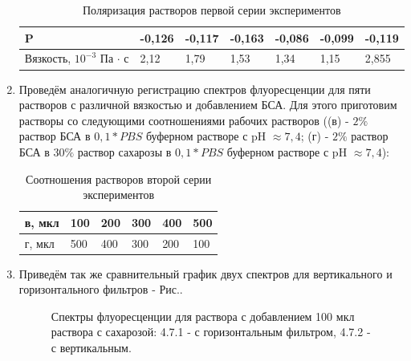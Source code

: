 \documentclass{article}
\begin{document}
\begin{enumerate}
    \begin{table}[h!]
    \centering
    \caption{Поляризация растворов первой серии экспериментов}
    \begin{tabular}{|l|l|l|l|l|l|l|}
    \hline
    P & -0,126 & -0,117 & -0,163 & -0,086 & -0,099 & -0,119 \\ \hline
    Вязкость, $10^{-3}$ Па $\cdot$ с & 2,12 & 1,79 & 1,53 & 1,34 & 1,15 & 2,855 \\ \hline
    \end{tabular}
    \end{table}
    \item Проведём аналогичную регистрацию спектров флуоресценции для пяти растворов с различной вязкостью и добавлением БСА. Для этого приготовим растворы со следующими соотношениями рабочих растворов ((в) - $2\%$ раствор БСА в $0,1 * PBS$ буферном растворе с pH $\approx 7,4$; (г) - $2\%$ раствор БСА в $30 \%$ раствор сахарозы в $0,1 * PBS$ буферном растворе с pH $\approx 7,4$):
    \begin{table}[h!]
    \centering
    \caption{Соотношения растворов второй серии экспериментов}
    \begin{tabular}{|l|l|l|l|l|l|}
    \hline
    в, мкл & 100 & 200 & 300 & 400 & 500\\ \hline
    г, мкл & 500 & 400 & 300 & 200 & 100\\ \hline
    \end{tabular}
    \end{table}
    \item Приведём так же сравнительный график двух спектров для вертикального и горизонтального фильтров - Рис.. 
    \begin{figure}[h!]
    \caption{Спектры флуоресценции для раствора с добавлением 100 мкл раствора с сахарозой: 4.7.1 - с горизонтальным фильтром, 4.7.2 - с вертикальным.}

\end{figure}
\end{enumerate}
\end{document}
